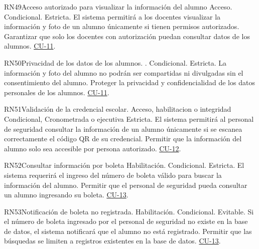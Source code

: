 \begin{BussinesRule}{RN49}{Acceso autorizado para visualizar la información del alumno}
    \BRitem[Tipo:] Acceso.
    \BRitem[Clase:] Condicional.
    \BRitem[Nivel:] Estricta.
    \BRitem[Descripción:] El sistema permitirá a los docentes visualizar la información y foto de un alumno únicamente si tienen permisos autorizados.
    \BRitem[Motivación:] Garantizar que solo los docentes con autorización puedan consultar datos de los alumnos.
     \hyperlink{CU-11}{CU-11}.
    \end{BussinesRule}

\begin{BussinesRule}{RN50}{Privacidad de los datos de los alumnos.}
    \BRitem[Tipo:] .
    \BRitem[Clase:] Condicional.
    \BRitem[Nivel:] Estricta.
    \BRitem[Descripción:] La información y foto del alumno no podrán ser compartidas ni divulgadas sin el consentimiento del alumno.
    \BRitem[Motivación:] Proteger la privacidad y confidencialidad de los datos personales de los alumnos.
     \hyperlink{CU-11}{CU-11}.
    \end{BussinesRule}

\begin{BussinesRule}{RN51}{Validación de la credencial escolar.}
    \BRitem[Tipo:] Acceso, habilitacion o integridad
    \BRitem[Clase:] Condicional, Cronometrada o ejecutiva 
    \BRitem[Nivel:] Estricta.
    \BRitem[Descripción:] El sistema permitirá al personal de seguridad consultar la información de un alumno únicamente si se escanea correctamente el código QR de su credencial.
    \BRitem[Motivación:] Permitir que la información del alumno solo sea accesible por persona autorizado.
     \hyperlink{CU-12}{CU-12}.
    \end{BussinesRule}

\begin{BussinesRule}{RN52}{Consultar información por boleta}
    \BRitem[Tipo:] Habilitación.
    \BRitem[Clase:] Condicional.
    \BRitem[Nivel:] Estricta.
    \BRitem[Descripción:] El sistema requerirá el ingreso del número de boleta válido para buscar la información del alumno.
    \BRitem[Motivación:] Permitir que el personal de seguridad pueda consultar un alumno ingresando su boleta. 
     \hyperlink{CU-13}{CU-13}.
    \end{BussinesRule}

\begin{BussinesRule}{RN53}{Notificación de boleta no registrada.}
    \BRitem[Tipo:] Habilitación.
    \BRitem[Clase:] Condicional.
    \BRitem[Nivel:] Evitable.
    \BRitem[Descripción:] Si el número de boleta ingresado por el personal de seguridad no existe en la base de datos, el sistema notificará que el alumno no está registrado.
    \BRitem[Motivación:] Permitir que las búsquedas se limiten a registros existentes en la base de datos.
     \hyperlink{CU-13}{CU-13}.
    \end{BussinesRule}

